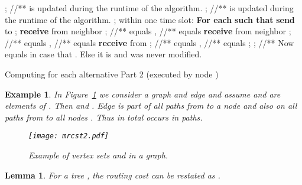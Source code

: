 \documentclass[11pt]{article}
\newtheorem{lemma}[theorem]{Lemma}
\newtheorem{example}[theorem]{Example}
\begin{document}
\begin{algorithm}[!htbp]
\begin{algorithmic}[1]
\State ; //** is updated during the runtime of the algorithm.
\If{}
\State ; //** is updated during the runtime of the algorithm.
\Else
\State ;
\EndIf
\For{}
\State within one time slot:
\newline \hspace*{0.8cm}\textbf{For each}  \textbf{such that}  \textbf{send}  to
\newline \hspace*{0.8cm};
\newline \hspace*{0.8cm}\textbf{receive}  from neighbor ; //**  equals ,
\newline \hspace*{6.2cm}//**  equals 
\newline \hspace*{0.8cm}\textbf{receive}  from neighbor ; //**  equals ,
\newline \hspace*{6.2cm}//**  equals 
\newline \hspace*{0.8cm}
\newline \hspace*{0.8cm}\textbf{receive}  from ; //**  equals ,
\newline \hspace*{6.3cm}//**  equals 
\For{}
\If{}
\State ;
\State ;
\EndIf
\EndFor
\EndFor
\State //** Now  equals  in case that . Else it is  and was never modified. 
\end{algorithmic}
\caption{Computing  for each  alternative Part 2 (executed by node )}\label{ALGRAND}
\vspace*{0.5cm}
\end{algorithm}

\begin{example}\label{ex:Ue1}
In Figure~\ref{fig:mrcst} we consider a graph  and edge  and assume  and  are elements of . Then  and  . Edge  is part of all  paths from  to a node  and also on all  paths from  to all nodes . Thus in total  occurs in  paths. 
\begin{figure}[ht]
\centering
\texttt{[image: mrcst2.pdf]}
\caption{Example of vertex sets  and  in a graph.}
\label{fig:mrcst}
\end{figure} 
\end{example}


\begin{lemma}\label{lem:lem}
For a tree , the routing cost  can be restated as .
\end{lemma}
\end{document}
